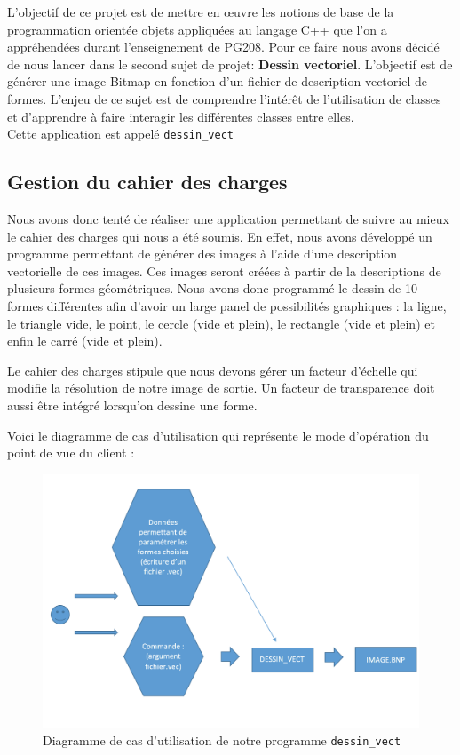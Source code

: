 \documentclass[11pt]{article}
\begin{document}
L'objectif de ce projet est de mettre en œuvre les notions de base de la programmation orientée objets appliquées au langage C++ que l'on a appréhendées durant l’enseignement de PG208. Pour ce faire nous avons décidé de nous lancer dans le second sujet de projet: \textbf{Dessin vectoriel}. L'objectif est de générer une image Bitmap en fonction d'un fichier de description vectoriel de formes. L'enjeu de ce sujet est de comprendre l’intérêt de l'utilisation de classes et d'apprendre à faire interagir les différentes classes entre elles. \\

Cette application est appelé \texttt{dessin\_vect}

\subsection{Gestion du cahier des charges}

Nous avons donc tenté de réaliser une application permettant de suivre au mieux le cahier des charges qui nous a été soumis. En effet, nous avons développé un programme permettant de générer des images à l’aide d’une description vectorielle de ces images. Ces images seront créées à partir de la descriptions de plusieurs formes géométriques. Nous avons donc programmé le dessin de 10 formes différentes afin d'avoir un large panel de possibilités graphiques : la ligne, le triangle vide, le point, le cercle (vide et plein), le rectangle (vide et plein) et enfin le carré (vide et plein). 

Le cahier des charges stipule que nous devons gérer un facteur d'échelle qui modifie la résolution de notre image de sortie. Un facteur de transparence doit aussi être intégré lorsqu'on dessine une forme. 

Voici le diagramme de cas d'utilisation qui représente le mode d'opération du point de vue du client : 

\begin{figure}[!htbp]
    \begin{center}
        \includegraphics[width=13cm]{Photo1.png}
        \caption[Diagramme des cas d'utilisation]{Diagramme de cas d'utilisation de notre programme \texttt{dessin\_vect}}
    \centering
    \end{center}
\end{figure}
\end{document}
